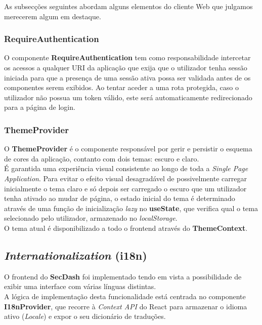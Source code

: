 As subsecções seguintes abordam alguns elementos do cliente Web que julgamos merecerem algum em destaque. \\

\subsubsection{RequireAuthentication}

O componente \textbf{RequireAuthentication} tem como responsabilidade intercetar os acessos a qualquer URI da aplicação que exija que o utilizador tenha sessão iniciada para que a presença de uma sessão ativa possa ser validada antes de os componentes serem exibidos. Ao tentar aceder a uma rota protegida, caso o utilizador não possua um token válido, este será automaticamente redirecionado para a página de login. \\

\subsubsection{ThemeProvider}

O \textbf{ThemeProvider} é o componente responsável por gerir e persistir o esquema de cores da aplicação, contanto com dois temas: escuro e claro. \\

É garantida uma experiência visual consistente ao longo de toda a \textit{Single Page Application}. Para evitar o efeito visual desagradável de possivelmente carregar inicialmente o tema claro e só depois ser carregado o escuro que um utilizador tenha ativado ao mudar de página, o estado inicial do tema é determinado através de uma função de inicialização \textit{lazy} no \textbf{useState}, que verifica qual o tema selecionado pelo utilizador, armazenado no \textit{localStorage}. \\

O tema atual é disponibilizado a todo o frontend através do \textbf{ThemeContext}. \\

\subsection{\textit{Internationalization} (i18n)}

O frontend do \textbf{SecDash} foi implementado tendo em vista a possibilidade de exibir uma interface com várias línguas distintas. \\

A lógica de implementação desta funcionalidade está centrada no componente \textbf{I18nProvider}, que recorre à \textit{Context API} do React para armazenar o idioma ativo (\textit{Locale}) e expor o seu dicionário de traduções. \\

